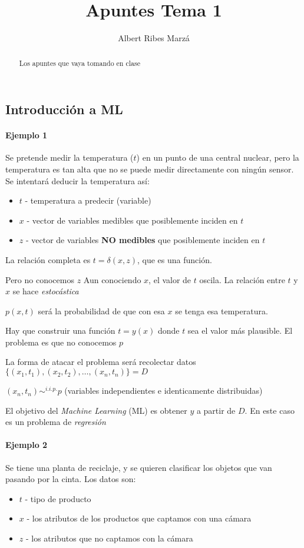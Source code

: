 \documentclass[a4paper,10pt]{article}
\title{Apuntes Tema 1}
\author{Albert Ribes Marzá}
\begin{document}
\maketitle

\begin{abstract}
Los apuntes que vaya tomando en clase
\end{abstract}

\section{}
\subsection{Introducción a ML}
\paragraph{Ejemplo 1}
Se pretende medir la temperatura ($t$) en un punto de una central nuclear, pero la temperatura es tan alta que no se puede medir directamente con ningún sensor. Se intentará deducir la temperatura así:
\begin{itemize}
\item $t$ - temperatura a predecir (variable)
\item $x$ - vector de variables medibles que posiblemente inciden en $t$
\item $z$ - vector de variables \textbf{NO medibles} que posiblemente inciden en $t$
\end{itemize}

La relación completa es $ t = \delta(x,z)$, que es una función.

Pero no conocemos $z$ \MVRightarrow Aun conociendo $x$, el valor de $t$ oscila. La relación entre $t$ y $x$ se hace \textit{estocástica}

$p(x,t)$ será la probabilidad de que con esa $x$ se tenga esa temperatura.

Hay que construir una función $t = y(x)$ donde $t$ sea el valor más plausible. El problema es que no conocemos $p$

La forma de atacar el problema será recolectar datos $\{(x_1,t_1),(x_2,t_2), \dots ,(x_n,t_n)\} = D$

$(x_n,t_n) \sim^{i.i.p.} p$ (variables independientes e identicamente distribuidas)


El objetivo del \textit{Machine Learning} (ML) es obtener $y$ a partir de $D$. En este caso es un problema de \textit{regresión}



\paragraph{Ejemplo 2}
Se tiene una planta de reciclaje, y se quieren clasificar los objetos que van pasando por la cinta. Los datos son:
\begin{itemize}
\item $t$ - tipo de producto
\item $x$ - los atributos de los productos que captamos con una cámara
\item $z$ - los atributos que no captamos con la cámara
\end{itemize}
\end{document}
